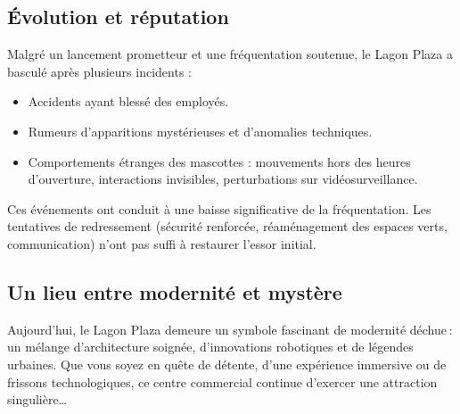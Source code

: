 \subsection{Évolution et réputation}
Malgré un lancement prometteur et une fréquentation soutenue, le Lagon Plaza a basculé après plusieurs incidents :
\begin{itemize}
  \item Accidents ayant blessé des employés.
  \item Rumeurs d’apparitions mystérieuses et d’anomalies techniques.
  \item Comportements étranges des mascottes : mouvements hors des heures d’ouverture, interactions invisibles, perturbations sur vidéosurveillance.
\end{itemize}
Ces événements ont conduit à une baisse significative de la fréquentation. Les tentatives de redressement (sécurité renforcée, réaménagement des espaces verts, communication) n’ont pas suffi à restaurer l’essor initial.

\subsection{Un lieu entre modernité et mystère}
Aujourd’hui, le Lagon Plaza demeure un symbole fascinant de modernité déchue : un mélange d’architecture soignée, d’innovations robotiques et de légendes urbaines. Que vous soyez en quête de détente, d’une expérience immersive ou de frissons technologiques, ce centre commercial continue d’exercer une attraction singulière…  
